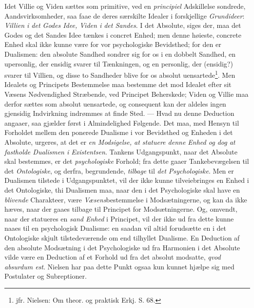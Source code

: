 \documentclass[12pt,a4paper]{book}
\newcommand{\opage}[1]{\marginnote{\footnotesize\textit{[#1]}}}
\begin{document}
Idet Villie og Viden sættes som primitive, ved en \emph{principiel} Adskillelse sondrede,
Aandsvirksomheder, saa faae de deres særskilte Idealer i forskjellige \emph{Grundideer}:
\emph{Villien i det Godes Idee, Viden i det Sandes}. I det Absolute, siges der, maa det
Godes og det Sandes Idee tænkes i concret Enhed; men denne høieste, concrete Enhed skal
ikke kunne være for vor psychologiske Bevidsthed; for den er Dualismen: den absolute
Sandhed sondrer sig for os i en dobbelt Sandhed, en upersonlig, der ensidig svarer til
Tænkningen, og en personlig, der (ensidig?) svarer til Villien, og disse to Sandheder
blive for os absolut uensartede\footnote{jfr. Nielsen: Om theor. og praktisk Erkj. S. 68.}.
Men Idealets og Principets Bestemmelse maa bestemme det mod Idealet efter sit Væsens
Nødvendighed Stræbende, ved Principet Beherskede; Viden og Villie maa derfor sættes som
absolut uensartede, og consequent kan der aldeles ingen gjensidig Indvirkning indrømmes at
finde Sted. --- Hvad nu denne Deduction angaaer, saa gjælder først i Almindelighed
Følgende. Det maa, med Hensyn til Forholdet mellem den ponerede Dualisme i vor Bevidsthed
og Enheden i det Absolute, urgeres, at det er \emph{en Modsigelse, at statuere denne Enhed
og dog at fastholde Dualismen i Existentsen}. Tankens Udgangspunkt, naar det Absolute skal
bestemmes, er det \emph{psychologiske} Forhold; fra dette gaaer Tankebevægelsen til det
\emph{Ontologiske}, og derfra, begrundende, \emph{tilbage} til \emph{det Psychologiske}. Men er Dualismen
tilstede i Udgangspunktet, vil der ikke kunne tilveiebringes en Enhed i \opage{154}det Ontologiske,
thi Dualismen maa, naar den i det Psychologiske skal have en \emph{blivende} Charakteer,
være \emph{Væsens}bestemmelse i Modsætningerne, og kan da ikke hæves, naar der gaaes
tilbage til Principet for Modsætningerne. Og, omvendt, naar der statueres en \emph{sand
Enhed} i Principet, vil der ikke ud fra dette kunne naaes til en psychologisk Dualisme: en
saadan vil altid forudsætte en i det Ontologiske skjult tilstedeværende om end tilhyllet
Dualisme. En Deduction af den absolute Modsætning i det Psychologiske ud fra Harmonien i
det Absolute vilde være en Deduction af et Forhold ud fra det absolut modsatte,
\textit{qvod absurdum est}. Nielsen har paa dette Punkt ogsaa kun kunnet hjælpe sig med
Postulater og Subreptioner.
\end{document}
